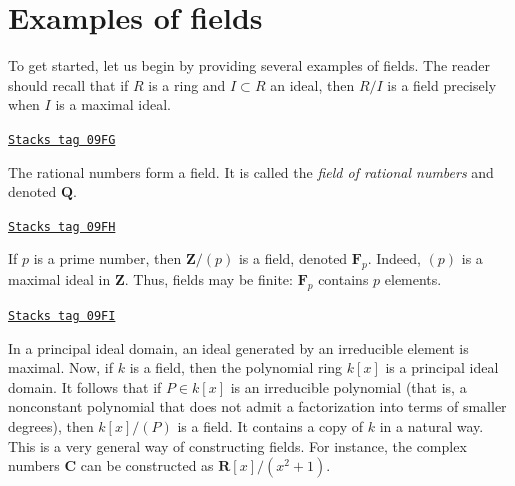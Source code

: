\section{Examples of fields}
\label{fields-section-examples}
To get started, let us begin by providing several examples of fields. The
reader should recall that if $R$ is a ring and $I \subset R$ an
ideal, then $R/I$ is a field precisely when $I$ is a maximal ideal.

\begin{example}

\label{fields-example-rational-numbers}
\href{https://stacks.math.columbia.edu/tag/09FG}{\texttt{Stacks tag 09FG}}

The rational numbers form a field. It is called the
{\it field of rational numbers} and denoted $\mathbf{Q}$.
\end{example}

\begin{example}

\label{fields-example-prime-field}
\href{https://stacks.math.columbia.edu/tag/09FH}{\texttt{Stacks tag 09FH}}

If $p$ is a prime number, then $\mathbf{Z}/(p)$ is a field, denoted
$\mathbf{F}_p$. Indeed, $(p)$ is a
maximal ideal in $\mathbf{Z}$. Thus, fields may be finite: $\mathbf{F}_p$
contains $p$ elements.
\end{example}

\begin{example}
\label{fields-example-quotient-polymial-ring}
\href{https://stacks.math.columbia.edu/tag/09FI}{\texttt{Stacks tag 09FI}}

In a principal ideal domain, an ideal generated by an irreducible element
is maximal. Now, if $k$ is a field, then the polynomial ring $k[x]$ is a
principal ideal domain. It follows that if $P \in k[x]$ is an irreducible
polynomial (that is, a nonconstant polynomial
that does not admit a factorization into terms of smaller degrees), then
$k[x]/(P)$ is a field. It contains a copy of $k$ in a natural way.
This is a very general way of constructing fields. For instance, the
complex numbers $\mathbf{C}$
can be constructed as $\mathbf{R}[x]/(x^2 + 1)$.
\end{example}

